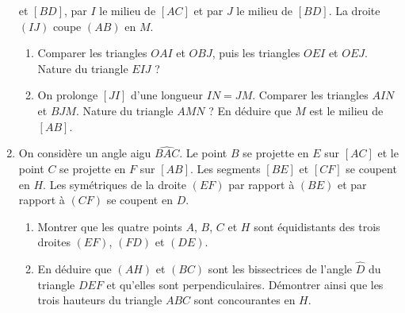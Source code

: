 \begin{enumerate}
et $[BD]$, par $I$ le milieu de $[AC]$ et par $J$ le milieu de $[BD]$. La droite $(IJ)$ coupe $(AB)$ en $M$.
\begin{enumerate}
\item Comparer les triangles $OAI$ et $OBJ$, puis les triangles $OEI$ et $OEJ$. 
Nature du triangle $EIJ$ ? 
\item On prolonge $[JI]$ d'une longueur $IN=JM$. Comparer les triangles $AIN$ et $BJM$. Nature du triangle $AMN$ ? En déduire que $M$ est le milieu de $[AB]$. 
\end{enumerate}
\item On considère un angle aigu $\widehat{BAC}$. Le point $B$ se projette en $E$
sur $[AC]$ et le point $C$ se projette en $F$ sur $[AB]$. Les segments $[BE]$ et $[CF]$ se coupent en $H$. Les symétriques de la droite $(EF)$ par rapport à $(BE)$
et par rapport à $(CF)$ se coupent en $D$. 
\begin{enumerate}
\item Montrer que les quatre points $A$, $B$, $C$ et $H$ sont équidistants des trois droites $(EF)$, $(FD)$ et $(DE)$. 
\item En déduire que $(AH)$ et $(BC)$ sont les bissectrices de l'angle $\widehat{D}$ du triangle $DEF$ et qu'elles sont perpendiculaires. Démontrer ainsi que les trois 
hauteurs du triangle $ABC$ sont concourantes en $H$. 
\end{enumerate}
 \end{enumerate}
 
 